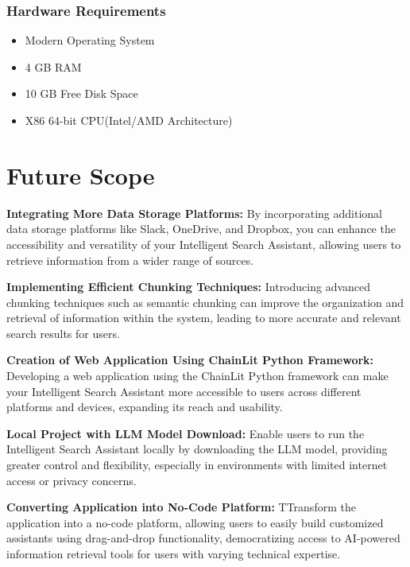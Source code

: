 \documentclass[12pt,a4paper,oneside]{report}
\begin{document}
\subsection{Hardware Requirements}

\begin{itemize}
\item{Modern Operating System}
\item{4 GB RAM}
\item{10 GB Free Disk Space}
\item{X86 64-bit CPU(Intel/AMD Architecture)}
\end{itemize}




\newpage
\chapter{Future Scope}
\textbf{    Integrating More Data Storage Platforms:} By incorporating additional data storage platforms like Slack, OneDrive, and Dropbox, you can enhance the accessibility and versatility of your Intelligent Search Assistant, allowing users to retrieve information from a wider range of sources.

\textbf{Implementing Efficient Chunking Techniques:} Introducing advanced chunking techniques such as semantic chunking can improve the organization and retrieval of information within the system, leading to more accurate and relevant search results for users.


\textbf{Creation of Web Application Using ChainLit Python Framework:} Developing a web application using the ChainLit Python framework can make your Intelligent Search Assistant more accessible to users across different platforms and devices, expanding its reach and usability.

\textbf{Local Project with LLM Model Download:} Enable users to run the Intelligent Search Assistant locally by downloading the LLM model, providing greater control and flexibility, especially in environments with limited internet access or privacy concerns.

\textbf{Converting Application into No-Code Platform:} TTransform the application into a no-code platform, allowing users to easily build customized assistants using drag-and-drop functionality, democratizing access to AI-powered information retrieval tools for users with varying technical expertise.
\newpage
\end{document}
